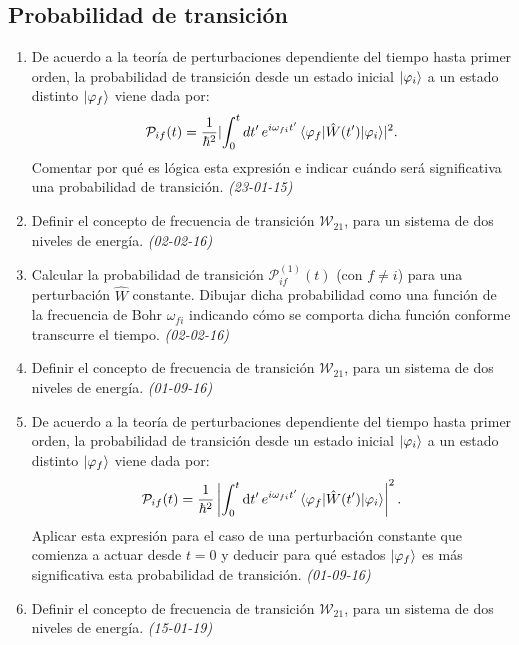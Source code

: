 \subsection*{Probabilidad de transición}

\begin{enumerate}
    
    \item De acuerdo a la teoría de perturbaciones dependiente del tiempo hasta primer orden, la probabilidad de transición desde un estado inicial \( \ket{\varphi_i} \) a un estado distinto \( \ket{\varphi_f} \) viene dada por:
    \[
    \mathcal{P}_{if}(t) = \frac{1}{\hbar^2} \lvert\int_0^t dt' \, e^{i \omega_{fi} t'} \mel{\varphi_f}{\hat{W}(t')}{\varphi_i}\rvert^2.
    \]
    Comentar por qué es lógica esta expresión e indicar cuándo será significativa una probabilidad de transición. \textit{(23-01-15)}    

    \item Definir el concepto de frecuencia de transición $\mathcal{W}_{21}$, para un sistema de dos niveles de energía. \textit{(02-02-16)}

    \item Calcular la probabilidad de transición $\mathcal{P}_{if}^{(1)} (t)$ (con $f \neq i$) para una perturbación $\hat{W}$ constante. Dibujar dicha probabilidad como una función de la frecuencia de Bohr $\omega_{fi}$ indicando cómo se comporta dicha función conforme transcurre el tiempo. \textit{(02-02-16)}
    
    \item Definir el concepto de frecuencia de transición $\mathcal{W}_{21}$, para un sistema de dos niveles de energía. \textit{(01-09-16)}

    \item De acuerdo a la teoría de perturbaciones dependiente del tiempo hasta primer orden, la probabilidad de transición desde un estado inicial $\ket{\varphi_i}$ a un estado distinto $\ket{\varphi_f}$ viene dada por:
    \[
    \mathcal{P}_{if}(t) = \frac{1}{\hbar^2} \left| \int_0^t \dd{t'} e^{i \omega_{fi} t'} \mel{\varphi_f}{\hat{W}(t')}{\varphi_i} \right|^2.
    \]
    Aplicar esta expresión para el caso de una perturbación constante que comienza a actuar desde $t = 0$ y deducir para qué estados $\ket{\varphi_f}$ es más significativa esta probabilidad de transición. \textit{(01-09-16)}

    \item Definir el concepto de frecuencia de transición $\mathcal{W}_{21}$, para un sistema de dos niveles de energía. \textit{(15-01-19)}
    

\end{enumerate}
